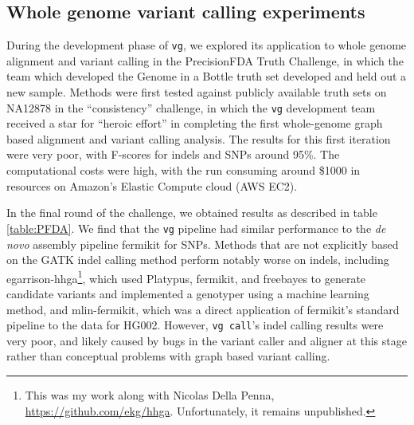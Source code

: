 \documentclass[a4paper,12pt,numbered,oneside]{Classes/PhDThesisPSnPDF}
\begin{document}
\subsection{Whole genome variant calling experiments}

During the development phase of {\tt vg}, we explored its application to whole genome alignment and variant calling in the PrecisionFDA Truth Challenge, in which the team which developed the Genome in a Bottle truth set developed and held out a new sample.
Methods were first tested against publicly available truth sets on NA12878 in the ``consistency'' challenge, in which the {\tt vg} development team received a star for ``heroic effort'' in completing the first whole-genome graph based alignment and variant calling analysis.
The results for this first iteration were very poor, with F-scores for indels and SNPs around 95\%.
The computational costs were high, with the run consuming around \$1000 in resources on Amazon's Elastic Compute cloud (AWS EC2).

In the final round of the challenge, we obtained results as described in table \ref{table:PFDA}.
We find that the {\tt vg} pipeline had similar performance to the \emph{de novo} assembly pipeline fermikit for SNPs.
Methods that are not explicitly based on the GATK indel calling method perform notably worse on indels, including egarrison-hhga\footnote{This was my work along with Nicolas Della Penna, \url{https://github.com/ekg/hhga}. Unfortunately, it remains unpublished.}, which used Platypus, fermikit, and freebayes to generate candidate variants and implemented a genotyper using a machine learning method, and mlin-fermikit, which was a direct application of fermikit's standard pipeline to the data for HG002.
However, {\tt vg call}'s indel calling results were very poor, and likely caused by bugs in the variant caller and aligner at this stage rather than conceptual problems with graph based variant calling.
\end{document}
